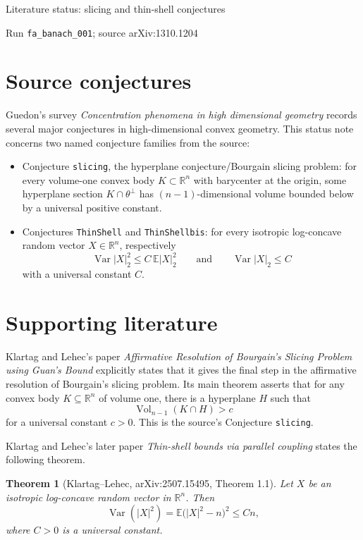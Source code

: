 \documentclass[11pt]{article}
\newtheorem{theorem}{Theorem}
\begin{document}
\begin{center}
{\Large Literature status: slicing and thin-shell conjectures}

\medskip
{\small Run \texttt{fa\_banach\_001}; source arXiv:1310.1204}
\end{center}

\section*{Source conjectures}

Guedon's survey \emph{Concentration phenomena in high dimensional geometry}
records several major conjectures in high-dimensional convex geometry.  This
status note concerns two named conjecture families from the source:

\begin{itemize}
\item Conjecture \texttt{slicing}, the hyperplane conjecture/Bourgain slicing
problem: for every volume-one convex body \(K\subset \mathbb{R}^n\) with
barycenter at the origin, some hyperplane section \(K\cap \theta^\perp\) has
\((n-1)\)-dimensional volume bounded below by a universal positive constant.
\item Conjectures \texttt{ThinShell} and \texttt{ThinShellbis}: for every
isotropic log-concave random vector \(X\in\mathbb{R}^n\), respectively
\[
  \operatorname{Var}|X|_2^2 \le C\,\mathbb{E}|X|_2^2
  \qquad\text{and}\qquad
  \operatorname{Var}|X|_2\le C
\]
with a universal constant \(C\).
\end{itemize}

\section*{Supporting literature}

Klartag and Lehec's paper \emph{Affirmative Resolution of Bourgain's Slicing
Problem using Guan's Bound} explicitly states that it gives the final step in
the affirmative resolution of Bourgain's slicing problem.  Its main theorem
asserts that for any convex body \(K\subseteq \mathbb{R}^n\) of volume one,
there is a hyperplane \(H\) such that
\[
  \operatorname{Vol}_{n-1}(K\cap H)>c
\]
for a universal constant \(c>0\).  This is the source's Conjecture
\texttt{slicing}.

Klartag and Lehec's later paper \emph{Thin-shell bounds via parallel coupling}
states the following theorem.

\begin{theorem}[Klartag--Lehec, arXiv:2507.15495, Theorem 1.1]
Let \(X\) be an isotropic log-concave random vector in \(\mathbb{R}^n\).  Then
\[
  \operatorname{Var}(|X|^2)
  = \mathbb{E}\bigl(|X|^2-n\bigr)^2
  \le Cn,
\]
where \(C>0\) is a universal constant.
\end{theorem}
\end{document}
